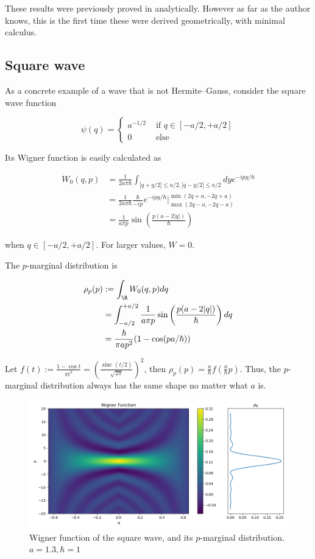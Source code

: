 {These results were previously proved in
\cite{andrewsEvolutionFreeWave2008} analytically. However as far as the
author knows, this is the first time these were derived geometrically,
with minimal calculus.

\subsection{Square wave}

As a concrete example of a wave that is not Hermite--Gauss, consider the
square wave function

$$
\psi(q) = \begin{cases}a^{-1/2} & \text{ if }q \in [-a/2, +a/2]\\ 0  & \text{ else}\end{cases}
$$

Its Wigner function is easily calculated as

$$
\begin{aligned}
      W_0(q, p) &= \frac{1}{2a\pi \hbar} \int_{|q + y/2| \leq a/2, |q - y/2| \leq a/2} dy e^{-ipy /\hbar} \\
      &= \frac{1}{2a\pi \hbar} \frac{\hbar}{-ip} e^{-ipy /\hbar}\Big|_{\max(2q - a, -2q- a)}^{\min(2q+a, -2q+a)}\\
      &= \frac{1}{a \pi p} \sin\left(\frac{p(a - 2|q|)}{\hbar} \right)
      \end{aligned}
$$

when $q \in [-a/2, +a/2]$. For larger values, $W = 0$.

The $p$-marginal distribution is

$$
\begin{aligned}
\rho_p(p) &:= \int_\R  W_0(q,p)dq  \\
      &= \int_{-a/2}^{+a/2} \frac{1}{a \pi p} \sin\left(\frac{p(a - 2|q|)}{\hbar} \right) dq \\
      &= \frac{\hbar }{\pi a p^2} ( 1 - \cos(pa /\hbar))
\end{aligned}
$$

Let
$f(t) := \frac{1 - \cos t}{\pi t^2} = \left(\frac{\operatorname{sinc}(t/2)}{\sqrt{2\pi}} \right)^2$,
then $\rho_p(p) = \frac{a}{\hbar} f(\frac{a}{\hbar}p)$. Thus, the
$p$-marginal distribution always has the same shape no matter what
$a$ is.

\begin{figure}
\centering
\includegraphics{figure/square_wave_wigner.png}
\caption{Wigner function of the square wave, and its $p$-marginal
distribution. $a = 1.3, \hbar = 1$}
\end{figure}

}
